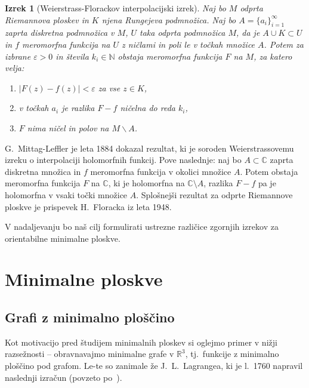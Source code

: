 \documentclass[12pt,a4paper,twoside]{article}
\theoremstyle{definition} %
\theoremstyle{plain} %
\newtheorem{izrek}[definicija]{Izrek}
\numberwithin{equation}{section}  %
\newcommand{\R}{\mathbb R}
\newcommand{\N}{\mathbb N}
\newcommand{\C}{\mathbb C}
\begin{document}
\begin{izrek} [Weierstrass-Florackov interpolacijski izrek] \label{izr:Weierstrass-Florack}
Naj bo $M$ odprta Riemannova ploskev in $K$ njena Rungejeva podmnožica. Naj bo $A = \{ a_i \}_{i=1}^{\infty}$ zaprta diskretna podmnožica v $M$, $U$ taka odprta podmnožica $M$, da je $A \cup K \subset U$ in $f$ meromorfna funkcija na $U$ z ničlami in poli le v točkah množice $A$.
Potem za izbrane $\varepsilon > 0$ in števila $k_{i} \in \N$ obstaja meromorfna funkcija $F$ na $M$, za katero velja:
\begin{enumerate}
\item $|F(z) - f(z)| < \varepsilon$ za vse $z \in K$,
\item v točkah $a_i$ je razlika $F-f$ ničelna do reda $k_i$,
\item $F$ nima ničel in polov na $M \backslash A$.
\end{enumerate} 
\end{izrek}

G.~Mittag-Leffler je leta 1884 dokazal rezultat, ki je soroden Weierstrassovemu izreku o interpolaciji holomorfnih funkcij. Pove naslednje:
naj bo $A \subset \C$ zaprta diskretna množica in $f$ meromorfna funkcija v okolici množice $A$. Potem obstaja meromorfna funkcija $F$ na $\C$, ki je holomorfna na $\C \setminus A$, razlika $F-f$ pa je holomorfna v vsaki točki množice $A$. \newline
Splošnejši rezultat za odprte Riemannove ploskve je prispevek H.~Floracka iz leta 1948. \newline

V nadaljevanju bo naš cilj formulirati ustrezne različice zgornjih izrekov za orientabilne minimalne ploskve.

\clearpage
\section{Minimalne ploskve}

\subsection{Grafi z minimalno ploščino}
%
Kot motivacijo pred študijem minimalnih ploskev si oglejmo primer v nižji razsežnosti -- obravnavajmo minimalne grafe v $\R^3$, tj.~funkcije z minimalno ploščino pod grafom. Le-te so zanimale že J.~L.~Lagrangea, ki je l.~1760 napravil naslednji izračun (povzeto po~\cite[Section~2,~4]{forstneric2021minimal}). 
\end{document}
